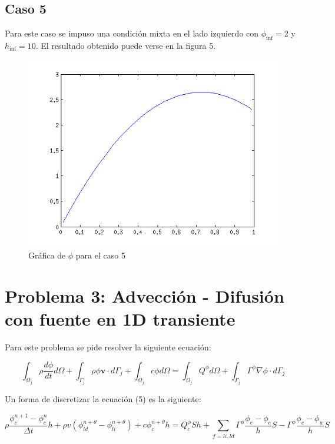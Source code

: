 \documentclass[11pt]{article}
\begin{document}
\bigskip 
\subsection{Caso 5}

Para este caso se impuso una condici\'on mixta en el lado izquierdo con $\phi_{\inf} = 2 $ y $ h_{\inf} = 10$. El resultado obtenido puede verse en la figura 5.

\begin{figure}[tbh]
	\centering
		\includegraphics[width=1.0\textwidth]{imagen5.png}
	\caption{Gr\'afica de $\phi$ para el caso 5}
	\label{fig:Fig1}
\end{figure}



\section{Problema 3: Advecci\'on - Difusi\'on con fuente en 1D transiente}

Para este problema se pide resolver la siguiente ecuaci\'on:

\begin{equation}
\int_{\Omega_j} \rho \frac{d\phi}{d t} d \Omega + \int_{\Gamma_j} \rho \phi \textbf{v} \cdot d \Gamma_j  + \int_{\Omega_j} c \phi d \Omega = \int_{\Omega_j} Q^{\phi} d \Omega + \int_{\Gamma_j} \Gamma^\phi \nabla \phi \cdot d \Gamma_j
\end{equation}

\bigskip Un forma de discretizar la ecuaci\'on (5) es la siguiente:

\begin{equation}
\rho \frac{\phi^{n+1}_{c} - \phi^{n}_{c}}{\Delta t}h  + \rho v (\phi_{ld}^{n+\theta} - \phi_{li}^{n+\theta}) + c\phi_c^{n+\theta}h = Q^{\phi}_c S h  + \sum_{f = li,ld} \Gamma^\phi \frac{\phi_e - \phi_c}{h} S - \Gamma^\phi \frac{\phi_c - \phi_w}{h} S 
\end{equation}
\end{document}
